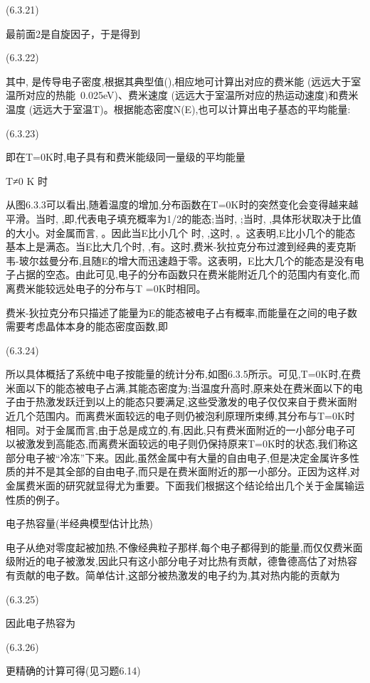  	(6.3.21)

最前面2是自旋因子，于是得到

 	(6.3.22)

其中, 是传导电子密度,根据其典型值(),相应地可计算出对应的费米能 (远远大于室温所对应的热能~0.025eV)、费米速度 (远远大于室温所对应的热运动速度)和费米温度 (远远大于室温T)。根据能态密度N(E),也可以计算出电子基态的平均能量:

 (6.3.23)

即在T=0K时,电子具有和费米能级同一量级的平均能量

T≠0 K 时

从图6.3.3可以看出,随着温度的增加,分布函数在T=0K时的突然变化会变得越来越平滑。当时, ,即,代表电子填充概率为1/2的能态;当时, ;当时, ,具体形状取决于比值的大小。对金属而言, 。因此当E比小几个 时, ,这时, 。这表明,E比小几个的能态基本上是满态。当E比大几个时, ,有。这时,费米-狄拉克分布过渡到经典的麦克斯韦-玻尔兹曼分布,且随E的增大而迅速趋于零。这表明，E比大几个的能态是没有电子占据的空态。由此可见,电子的分布函数只在费米能附近几个的范围内有变化,而离费米能较远处电子的分布与T =0K时相同。

费米-狄拉克分布只描述了能量为E的能态被电子占有概率,而能量在之间的电子数需要考虑晶体本身的能态密度函数,即

 	(6.3.24)



所以具体概括了系统中电子按能量的统计分布,如图6.3.5所示。可见,T=0K时,在费米面以下的能态被电子占满,其能态密度为;当温度升高时,原来处在费米面以下的电子由于热激发跃迁到以上的能态只要满足,这些受激发的电子仅仅来自于费米面附近几个范围内。而离费米面较远的电子则仍被泡利原理所束缚,其分布与T=0K时相同。对于金属而言,由于总是成立的,有,因此,只有费米面附近的一小部分电子可以被激发到高能态,而离费米面较远的电子则仍保持原来T=0K时的状态,我们称这部分电子被“冷冻”下来。因此,虽然金属中有大量的自由电子,但是决定金属许多性质的并不是其全部的自由电子,而只是在费米面附近的那一小部分。正因为这样,对金属费米面的研究就显得尤为重要。下面我们根据这个结论给出几个关于金属输运性质的例子。

电子热容量(半经典模型估计比热)

电子从绝对零度起被加热,不像经典粒子那样,每个电子都得到的能量,而仅仅费米面级附近的电子被激发,因此只有这小部分电子对比热有贡献，德鲁德高估了对热容有贡献的电子数。简单估计,这部分被热激发的电子约为,其对热内能的贡献为

 	(6.3.25)

因此电子热容为

	(6.3.26)

更精确的计算可得(见习题6.14)

